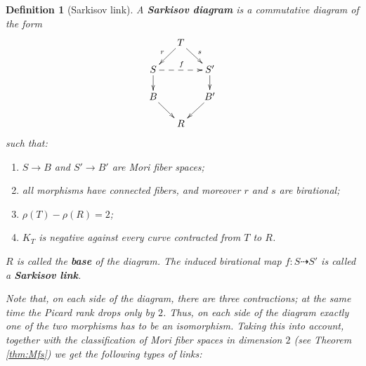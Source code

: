 \documentclass[a4paper,11pt]{amsart}
\newtheorem{definition}[theorem]{Definition}
\newcommand{\rmap}{\dashrightarrow}
\begin{document}
\begin{definition}[{Sarkisov link}]\label{def:SarkisovLink}
	A \textbf{Sarkisov diagram} is a commutative diagram of the form
	\[
	\xymatrix@R=.5cm@C=.5cm{
	& T \ar[ld]_r \ar[rd]^s\\
	S \ar[d] \ar@{-->}[rr]^f && S' \ar[d]\\
	B \ar[rd] && B' \ar[ld]\\
	& R
	}
	\]
	such that:
	\begin{enumerate}
		\item $S \to B$ and $S' \to B'$ are Mori fiber spaces;
		\item all morphisms have connected fibers, and moreover $r$ and $s$ are birational;
		\item $\rho(T) - \rho(R) = 2$;
		\item $K_T$ is negative against every curve contracted from $T$ to $R$.
	\end{enumerate}
	$R$ is called the \textbf{base} of the diagram.
	The induced birational map $f\colon S \rmap S'$ is called a \textbf{Sarkisov link}.
	
	Note that, on each side of the diagram, there are three contractions;
	at the same time the Picard rank drops only by $2$.
	Thus, on each side of the diagram exactly one of the two morphisms has to be an isomorphism.
	Taking this into account, together with the classification of Mori fiber spaces in dimension $2$ (see Theorem \ref{thm:Mfs}) we get the following types of links:\vspace{0.3cm}
	

\end{definition}
\end{document}
